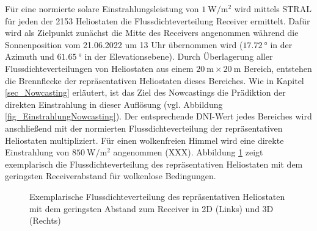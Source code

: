 Für eine normierte solare Einstrahlungsleistung von $\SI{1}{\watt\per\metre\squared}$ wird mittels STRAL für jeden der 2153 Heliostaten die Flussdichteverteilung Receiver ermittelt.
Dafür wird als Zielpunkt zunächst die Mitte des Receivers angenommen während die Sonnenposition vom 21.06.2022 um 13 Uhr übernommen wird ($\SI{17.72}{\degree}$ in der Azimuth und $\SI{61.65}{\degree}$ in der Elevationsebene).
Durch Überlagerung aller Flussdichteverteilungen von Heliostaten aus einem $\SI{20}{\metre} \times \SI{20}{\metre}$ Bereich, entstehen die Brennflecke der repräsentativen Heliostaten dieses Bereiches.
Wie in Kapitel \ref{sec_Nowcasting} erläutert, ist das Ziel des Nowcastings die Prädiktion der direkten Einstrahlung in dieser Auflösung (vgl. Abbildung \ref{fig_EinstrahlungNowcasting}).
Der entsprechende DNI-Wert jedes Bereiches wird anschließend mit der normierten Flussdichteverteilung der repräsentativen Heliostaten multipliziert.
Für einen wolkenfreien Himmel wird eine direkte Einstrahlung von $\SI{850}{\watt\per\metre\squared}$ angenommen (XXX).
Abbildung \ref{fig_CasadiFluxmap} zeigt exemplarisch die Flussdichteverteilung des repräsentativen Heliostaten mit dem geringsten Receiverabstand für wolkenlose Bedingungen.

\begin{figure}[h!]
    \centering
    \setlength{\fboxsep}{1pt}
    \setlength{\fboxrule}{1pt}
    \caption[Exemplarische Flussdichteverteilung des repräsentativen Heliostaten mit dem geringsten Abstand zum Receiver in 2D und 3D]{Exemplarische Flussdichteverteilung des repräsentativen Heliostaten mit dem geringsten Abstand zum Receiver in 2D (Links) und 3D (Rechts)}
    \label{fig_CasadiFluxmap}
\end{figure}

